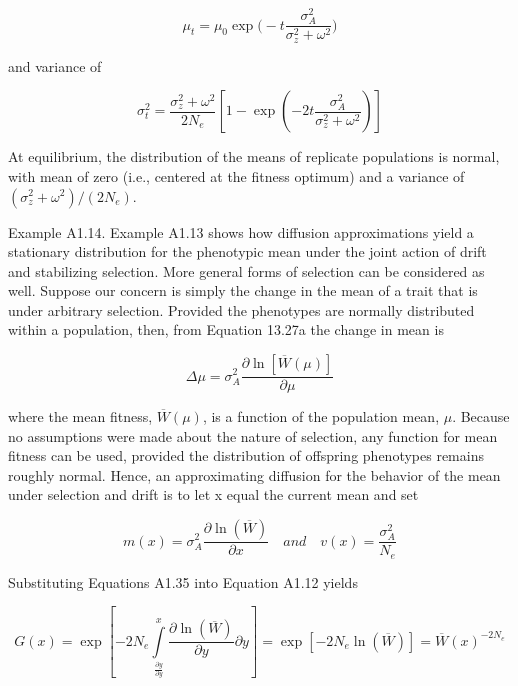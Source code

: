 \documentclass{article}
\begin{document}
\begin{equation}
\mu_{t}=\mu_{0}\exp\Big(-t\frac{\sigma_{A}^{2}}{\sigma_{z}^{2}+\omega^{2}}\Big)
\end{equation}

and variance of

\begin{equation}
\sigma_{t}^{2}=\frac{\sigma_{z}^{2}+\omega^{2}}{2N_{e}}\left[1-\exp\left(-2t\frac{\sigma_{A}^{2}}{\sigma_{z}^{2}+\omega^{2}}\right)\right]
\end{equation}

At equilibrium, the distribution of the means of replicate populations is normal, with mean of zero (i.e., centered at the fitness optimum) and a variance of  $ (\sigma_{z}^{2} + \omega^{2}) / (2N_{e}) $.

Example A1.14. Example A1.13 shows how diffusion approximations yield a stationary distribution for the phenotypic mean under the joint action of drift and stabilizing selection. More general forms of selection can be considered as well. Suppose our concern is simply the change in the mean of a trait that is under arbitrary selection. Provided the phenotypes are normally distributed within a population, then, from Equation 13.27a the change in mean is

\begin{equation}
\Delta\mu=\sigma_{A}^{2}\frac{\partial\ln[\overline{W}(\mu)]}{\partial\mu}
\end{equation}

where the mean fitness,  $ \overline{W}(\mu) $, is a function of the population mean,  $ \mu $. Because no assumptions were made about the nature of selection, any function for mean fitness can be used, provided the distribution of offspring phenotypes remains roughly normal. Hence, an approximating diffusion for the behavior of the mean under selection and drift is to let x equal the current mean and set

\begin{equation}
m(x)=\sigma_{A}^{2}\frac{\partial\ln(\overline{W})}{\partial x}\quad and\quad v(x)=\frac{\sigma_{A}^{2}}{N_{e}}
\end{equation}

Substituting Equations A1.35 into Equation A1.12 yields

\begin{equation}
G(x)=\exp\left[-2N_{e}\int\limits_{\frac{\partial y}{\partial y}}^{x}\frac{\partial\ln(\overline{W})}{\partial y}\partial y\right]=\exp[-2N_{e}\ln(\overline{W})]=\overline{W}(x)^{-2N_{e}}
\end{equation}
\end{document}
